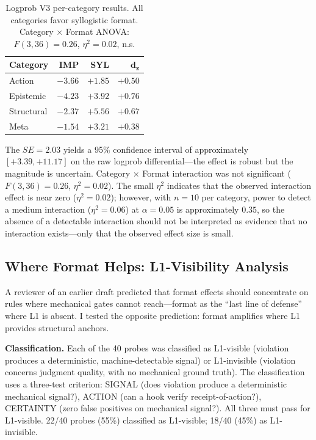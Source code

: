 \documentclass[11pt]{article}
\begin{document}
\begin{table}[t]
\centering
\begin{tabular}{lrrr}
\toprule
\textbf{Category} & \textbf{IMP} & \textbf{SYL} & $\mathbf{d_z}$ \\
\midrule
Action      & $-3.66$ & $+1.85$ & $+0.50$ \\
Epistemic   & $-4.23$ & $+3.92$ & $+0.76$ \\
Structural  & $-2.37$ & $+5.56$ & $+0.67$ \\
Meta        & $-1.54$ & $+3.21$ & $+0.38$ \\
\bottomrule
\end{tabular}
\caption{Logprob V3 per-category results. All categories favor syllogistic
format. Category $\times$ Format ANOVA: $F(3,36)=0.26$, $\eta^2=0.02$, n.s.}
\label{tab:v3}
\end{table}

The $SE = 2.03$ yields a 95\% confidence interval of approximately
$[+3.39, +11.17]$ on the raw logprob differential---the effect is robust but
the magnitude is uncertain. Category $\times$ Format interaction was not
significant ($F(3,36)=0.26$, $\eta^2=0.02$). The small $\eta^2$ indicates that the observed interaction effect is near zero
($\eta^2=0.02$); however, with $n=10$ per category, power to detect a medium
interaction ($\eta^2=0.06$) at $\alpha=0.05$ is approximately $0.35$, so the
absence of a detectable interaction should not be interpreted as evidence that
no interaction exists---only that the observed effect size is small.

\subsection{Where Format Helps: L1-Visibility Analysis}
\label{sec:l1vis}

A reviewer of an earlier draft predicted that format effects should concentrate
on rules where mechanical gates cannot reach---format as the ``last line of
defense'' where L1 is absent. I tested the opposite
prediction: format amplifies where L1 provides structural anchors.

\textbf{Classification.} Each of the 40 probes was classified as L1-visible
(violation produces a deterministic, machine-detectable signal) or L1-invisible
(violation concerns judgment quality, with no mechanical ground truth). The
classification uses a three-test criterion: SIGNAL (does violation produce a
deterministic mechanical signal?), ACTION (can a hook verify receipt-of-action?),
CERTAINTY (zero false positives on mechanical signal?). All three must pass for
L1-visible. 22/40 probes (55\%) classified as L1-visible; 18/40 (45\%) as
L1-invisible.
\end{document}
